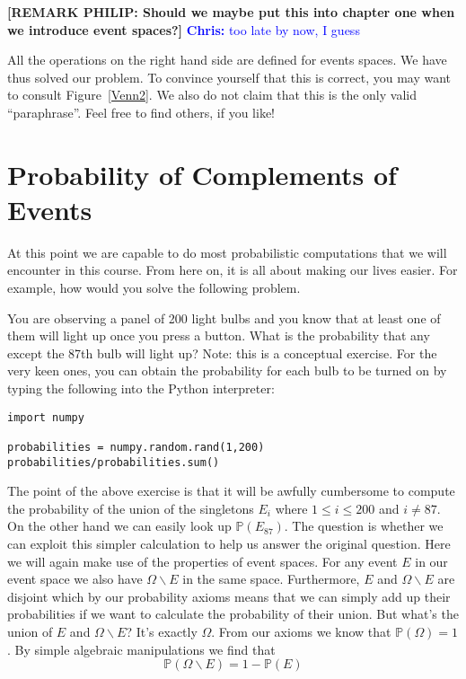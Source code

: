 \documentclass[a4paper,11pt,leqno]{report}
\newcommand{\chris}[1]{ \textcolor{blue}{\textbf{Chris:} #1}}
\begin{document}
\textbf{[REMARK PHILIP: Should we maybe put this into chapter one when we introduce event spaces?]}
\chris{too late by now, I guess}

All the operations on the right hand side are defined for events spaces. We have thus solved our problem.
To convince yourself that this is correct, you may want to consult Figure~\ref{Venn2}. We also do not claim
that this is the only valid ``paraphrase''. Feel free to find others, if you like!

\section{Probability of Complements of Events}
At this point we are capable to do most probabilistic computations that we will encounter in this course.
From here on, it is all about making our lives easier. For example, how would you solve the following 
problem.

\begin{Exercise}
You are observing a panel of 200 light bulbs and you know that at least one of them will light up once you 
press a button. What is the probability that any except the 87th bulb will light up? Note: this is a 
conceptual exercise. For the very keen ones, you can obtain the probability for each bulb to be turned on
by typing the following into the Python interpreter:

\begin{lstlisting}
import numpy

probabilities = numpy.random.rand(1,200)
probabilities/probabilities.sum()
\end{lstlisting} 
\end{Exercise}

The point of the above exercise is that it will be awfully cumbersome to compute the probability of the
union of the singletons $ {E_{i}} $ where $ 1 \leq i \leq 200 $ and $ i \not = 87 $. On the other hand
we can easily look up $ \mathbb{P}(E_{87}) $. The question is whether we can exploit this simpler calculation
to help us answer the original question. Here we will again make use of the properties of event spaces.
For any event $ E $ in our event space we also have $ \Omega \backslash E $ in the same space. Furthermore,
$ E $ and $ \Omega \backslash E $ are disjoint which by our probability axioms means that we can simply add
up their probabilities if we want to calculate the probability of their union. But what's the union
of $ E $ and $ \Omega \backslash E $? It's exactly $ \Omega $. From our axioms we know that 
$ \mathbb{P}(\Omega) = 1 $. By simple algebraic manipulations we find that 
\begin{equation}
\mathbb{P}(\Omega \backslash E) = 1 - \mathbb{P}(E)
\end{equation}
\end{document}

